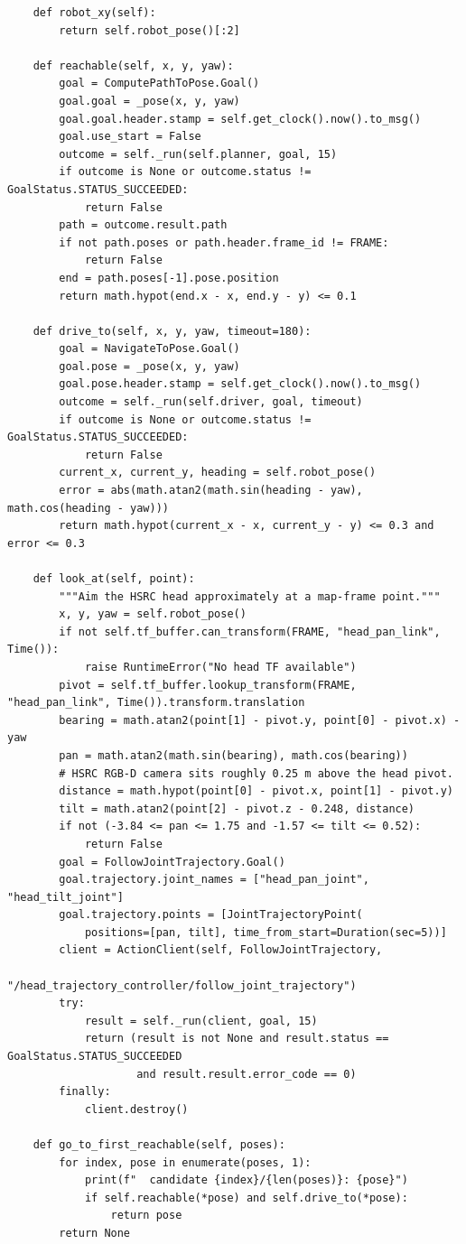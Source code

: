 \documentclass[11pt,a4paper]{book}
\begin{document}
\begin{lstlisting}
    def robot_xy(self):
        return self.robot_pose()[:2]

    def reachable(self, x, y, yaw):
        goal = ComputePathToPose.Goal()
        goal.goal = _pose(x, y, yaw)
        goal.goal.header.stamp = self.get_clock().now().to_msg()
        goal.use_start = False
        outcome = self._run(self.planner, goal, 15)
        if outcome is None or outcome.status != GoalStatus.STATUS_SUCCEEDED:
            return False
        path = outcome.result.path
        if not path.poses or path.header.frame_id != FRAME:
            return False
        end = path.poses[-1].pose.position
        return math.hypot(end.x - x, end.y - y) <= 0.1

    def drive_to(self, x, y, yaw, timeout=180):
        goal = NavigateToPose.Goal()
        goal.pose = _pose(x, y, yaw)
        goal.pose.header.stamp = self.get_clock().now().to_msg()
        outcome = self._run(self.driver, goal, timeout)
        if outcome is None or outcome.status != GoalStatus.STATUS_SUCCEEDED:
            return False
        current_x, current_y, heading = self.robot_pose()
        error = abs(math.atan2(math.sin(heading - yaw), math.cos(heading - yaw)))
        return math.hypot(current_x - x, current_y - y) <= 0.3 and error <= 0.3

    def look_at(self, point):
        """Aim the HSRC head approximately at a map-frame point."""
        x, y, yaw = self.robot_pose()
        if not self.tf_buffer.can_transform(FRAME, "head_pan_link", Time()):
            raise RuntimeError("No head TF available")
        pivot = self.tf_buffer.lookup_transform(FRAME, "head_pan_link", Time()).transform.translation
        bearing = math.atan2(point[1] - pivot.y, point[0] - pivot.x) - yaw
        pan = math.atan2(math.sin(bearing), math.cos(bearing))
        # HSRC RGB-D camera sits roughly 0.25 m above the head pivot.
        distance = math.hypot(point[0] - pivot.x, point[1] - pivot.y)
        tilt = math.atan2(point[2] - pivot.z - 0.248, distance)
        if not (-3.84 <= pan <= 1.75 and -1.57 <= tilt <= 0.52):
            return False
        goal = FollowJointTrajectory.Goal()
        goal.trajectory.joint_names = ["head_pan_joint", "head_tilt_joint"]
        goal.trajectory.points = [JointTrajectoryPoint(
            positions=[pan, tilt], time_from_start=Duration(sec=5))]
        client = ActionClient(self, FollowJointTrajectory,
                              "/head_trajectory_controller/follow_joint_trajectory")
        try:
            result = self._run(client, goal, 15)
            return (result is not None and result.status == GoalStatus.STATUS_SUCCEEDED
                    and result.result.error_code == 0)
        finally:
            client.destroy()

    def go_to_first_reachable(self, poses):
        for index, pose in enumerate(poses, 1):
            print(f"  candidate {index}/{len(poses)}: {pose}")
            if self.reachable(*pose) and self.drive_to(*pose):
                return pose
        return None
\end{lstlisting}
\end{document}
